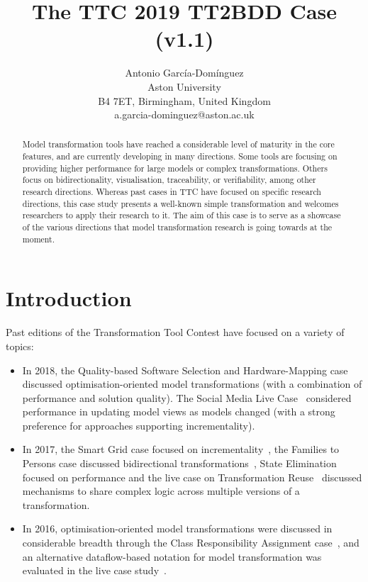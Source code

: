 \documentclass[a4paper]{scrartcl}
\title{The TTC 2019 TT2BDD Case (v1.1)}
\author{
  Antonio García-Domínguez\\
  Aston University\\
  B4 7ET, Birmingham, United Kingdom\\
  a.garcia-dominguez@aston.ac.uk
}
\begin{document}
\maketitle

\begin{abstract}
  Model transformation tools have reached a considerable level of maturity in
  the core features, and are currently developing in many directions. Some tools
  are focusing on providing higher performance for large models or complex
  transformations. Others focus on bidirectionality, visualisation,
  traceability, or verifiability, among other research directions. Whereas past
  cases in TTC have focused on specific research directions, this case study
  presents a well-known simple transformation and welcomes researchers to apply
  their research to it. The aim of this case is to serve as a showcase of the
  various directions that model transformation research is going towards at the
  moment.
\end{abstract}

\section{Introduction}

Past editions of the Transformation Tool Contest have focused on a variety of
topics:
\begin{itemize}
\item In 2018, the Quality-based Software Selection and Hardware-Mapping
  case~\cite{gotz_quality-based_2018} discussed optimisation-oriented model
  transformations (with a combination of performance and solution quality). The
  Social Media Live Case~\cite{hinkel_ttc_2018} considered performance in
  updating model views as models changed (with a strong preference for
  approaches supporting incrementality).

\item In 2017, the Smart Grid case focused on
  incrementality~\cite{hinkel_ttc_2017}, the Families to Persons case discussed
  bidirectional transformations~\cite{anjorin_families_2017}, State Elimination
  focused on performance and the live case on Transformation
  Reuse~\cite{live2017} discussed mechanisms to share complex logic across
  multiple versions of a transformation.

\item In 2016, optimisation-oriented model transformations were discussed in
  considerable breadth through the Class Responsibility Assignment
  case~\cite{fleck_class_2016}, and an alternative dataflow-based notation for
  model transformation was evaluated in the live case study~\cite{live2016}.
\end{itemize}
\end{document}
